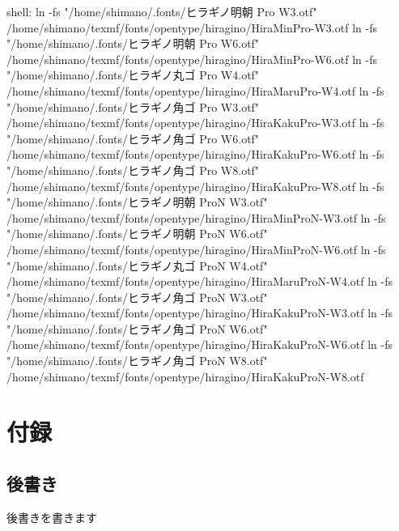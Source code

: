 \documentclass[a4j,12pt,openany,uplatex,dvipdfmx]{jsbook}
\begin{document}
\begin{programlist}[label={nil}]{shell}{: }ln -fs "/home/shimano/.fonts/ヒラギノ明朝 Pro W3.otf" /home/shimano/texmf/fonts/opentype/hiragino/HiraMinPro-W3.otf
ln -fs "/home/shimano/.fonts/ヒラギノ明朝 Pro W6.otf" /home/shimano/texmf/fonts/opentype/hiragino/HiraMinPro-W6.otf
ln -fs "/home/shimano/.fonts/ヒラギノ丸ゴ Pro W4.otf" /home/shimano/texmf/fonts/opentype/hiragino/HiraMaruPro-W4.otf
ln -fs "/home/shimano/.fonts/ヒラギノ角ゴ Pro W3.otf" /home/shimano/texmf/fonts/opentype/hiragino/HiraKakuPro-W3.otf
ln -fs "/home/shimano/.fonts/ヒラギノ角ゴ Pro W6.otf" /home/shimano/texmf/fonts/opentype/hiragino/HiraKakuPro-W6.otf
ln -fs "/home/shimano/.fonts/ヒラギノ角ゴ Pro W8.otf" /home/shimano/texmf/fonts/opentype/hiragino/HiraKakuPro-W8.otf
ln -fs "/home/shimano/.fonts/ヒラギノ明朝 ProN W3.otf" /home/shimano/texmf/fonts/opentype/hiragino/HiraMinProN-W3.otf
ln -fs "/home/shimano/.fonts/ヒラギノ明朝 ProN W6.otf" /home/shimano/texmf/fonts/opentype/hiragino/HiraMinProN-W6.otf
ln -fs "/home/shimano/.fonts/ヒラギノ丸ゴ ProN W4.otf" /home/shimano/texmf/fonts/opentype/hiragino/HiraMaruProN-W4.otf
ln -fs "/home/shimano/.fonts/ヒラギノ角ゴ ProN W3.otf" /home/shimano/texmf/fonts/opentype/hiragino/HiraKakuProN-W3.otf
ln -fs "/home/shimano/.fonts/ヒラギノ角ゴ ProN W6.otf" /home/shimano/texmf/fonts/opentype/hiragino/HiraKakuProN-W6.otf
ln -fs "/home/shimano/.fonts/ヒラギノ角ゴ ProN W8.otf" /home/shimano/texmf/fonts/opentype/hiragino/HiraKakuProN-W8.otf

\end{programlist}



\chapter{付録}
\label{sec:org5668ae8}
\appendix
\section{後書き}
\label{sec:org2290dd6}
後書きを書きます
\end{document}
